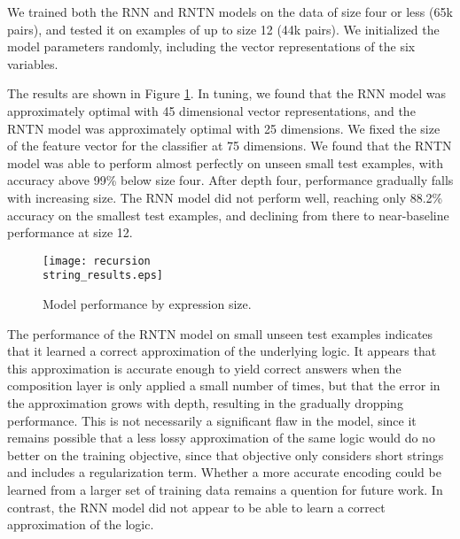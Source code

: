 We trained both the RNN and RNTN models on the data of size four or less (65k pairs), and tested it on examples of up to size 12 (44k pairs). We initialized the model parameters randomly, including the vector representations of the six variables. 

The results are shown in Figure \ref{prop-results}. In tuning, we found that the RNN model was approximately optimal with 45 dimensional vector representations, and the RNTN model was approximately optimal with 25 dimensions. We fixed the size of the feature vector for the classifier at 75 dimensions. We found that the RNTN model was able to perform almost perfectly on unseen small test examples, with accuracy above 99\% below size four. After depth four, performance gradually falls with increasing size. The RNN model did not perform well, reaching only 88.2\% accuracy on the smallest test examples, and declining from there to near-baseline performance at size 12. 

\begin{figure}[t]
\begin{center}
\texttt{[image: recursion\\string\_results.eps]}
\end{center}

\caption{Model performance by expression size.  \label{prop-results}} 
\end{figure}

The performance of the RNTN model on small unseen test examples indicates that it learned a correct approximation of the underlying logic. It appears that this approximation is accurate enough to yield correct answers when the composition layer is only applied a small number of times, but that the error in the approximation grows with depth, resulting in the gradually dropping performance. This is not necessarily a significant flaw in the model, since it remains possible that a less lossy approximation of the same logic would do no better on the training objective, since that objective only considers short strings and includes a regularization term. Whether a more accurate encoding could be learned from a larger set of training data remains a quention for future work. In contrast, the RNN model did not appear to be able to learn a correct approximation of the logic.

